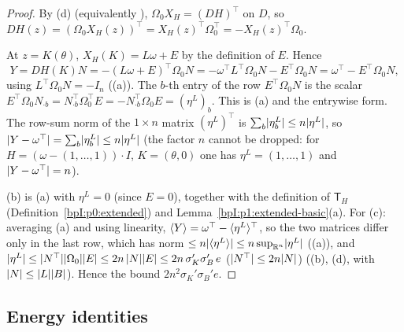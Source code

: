 \begin{proof}
\label{stepI:p1:lr-gradient}
By (d) (equivalently ), $\Omega_0X_H=(DH)^\top$ on $D$, so
$DH(z)=(\Omega_0X_H(z))^\top=X_H(z)^\top\Omega_0^\top=-X_H(z)^\top\Omega_0$.

\label{stepI:p1:lr-insert}
At $z=K(\theta)$, $X_H(K)=L\omega+E$ by the definition of $E$. Hence
\[
Y=DH(K)N=-(L\omega+E)^\top\Omega_0N=-\omega^\top L^\top\Omega_0N-E^\top\Omega_0N=\omega^\top-E^\top\Omega_0N,
\]
using $L^\top\Omega_0N=-I_n$ ((a)). The $b$-th entry of the row $E^\top\Omega_0N$ is the scalar
$E^\top\Omega_0N_{\cdot b}=N_{\cdot b}^\top\Omega_0^\top E=-N_{\cdot b}^\top\Omega_0E=(\eta^L)_b$. This is (a) and the entrywise form. The row-sum norm of
the $1\times n$ matrix $(\eta^L)^\top$ is $\sum_b\lvert \eta^L_b\rvert\le n\lvert \eta^L\rvert$, so $\lvert Y-\omega^\top\rvert=\sum_b\lvert \eta^L_b\rvert\le n\lvert \eta^L\rvert$ (the factor $n$ cannot be dropped: for $H=(\omega-(1,\dots,1))\cdot I$, $K=(\theta,0)$ one has $\eta^L=(1,\dots,1)$ and $\lvert Y-\omega^\top\rvert=n$).

\label{stepI:p1:lr-average}
(b) is (a) with $\eta^L=0$ (since $E=0$), together with the definition of $\mathsf T_H$
(Definition~\ref{bpI:p0:extended}) and Lemma~\ref{bpI:p1:extended-basic}(a). For (c): averaging (a) and using linearity,
$\langle Y\rangle=\omega^\top-\langle \eta^L\rangle^\top$, so the two matrices differ only in the last row, which has norm
$\le n\lvert \langle \eta^L\rangle\rvert\le n\sup_{\mathbb{R}^n}\lvert \eta^L\rvert$ ((a)), and
$\lvert \eta^L\rvert\le\lvert N^\top\rvert\lvert \Omega_0\rvert\lvert E\rvert\le2n\,\lvert N\rvert\lvert E\rvert\le2n\,\sigma_K'\sigma_B'\,e$ ($\lvert N^\top\rvert\le2n\lvert N\rvert$)
((b), (d), with $\lvert N\rvert\le\lvert L\rvert\lvert B\rvert$). Hence the bound $2n^2\sigma_K'\sigma_B'e$.
\end{proof}

\subsection{Energy identities}\label{bpI:p1:sec-energy}

